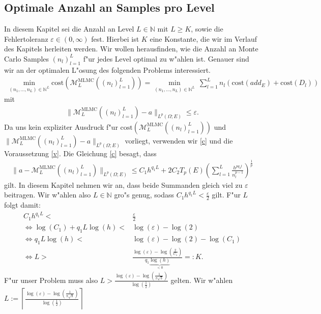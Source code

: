 \subsection{Optimale Anzahl an Samples pro Level}
In diesem Kapitel sei die Anzahl an Level $L\in\mathbb{N}$ mit $L\geq K$, sowie die Fehlertoleranz $\varepsilon\in (0,\infty)$ fest. Hierbei ist $K$ eine Konstante, die wir im Verlauf des Kapitels herleiten werden. Wir wollen herausfinden, wie die Anzahl an Monte Carlo Samples $(n_l)_{l=1}^L$ f"ur jedes Level optimal zu w"ahlen ist. Genauer sind wir an der optimalen L"osung des folgenden Problems interessiert.
\begin{align*}
\min_{(n_1,...,n_L) \in\mathbb{N}^L}\text{cost}\left(\mathcal{M}_L^{\text{MLMC}} ((n_l)_{l=1}^L)\right)=\min_{(n_1,...,n_L) \in\mathbb{N}^L} \ \sum_{l=1}^Ln_l(\text{cost}(add_E)+\text{cost}(D_l))
\end{align*}
mit
\begin{align*}
\|\mathcal{M}_L^{\text{MLMC}} ((n_l)_{l=1}^L)-a\|_{L^p(\Omega;E)}\leq \varepsilon.
\end{align*}
Da uns kein expliziter Ausdruck f"ur $\text{cost}\left(\mathcal{M}_L^{\text{MLMC}} ((n_l)_{l=1}^L)\right)$ und\\ $\|\mathcal{M}_L^{\text{MLMC}} ((n_l)_{l=1}^L)-a\|_{L^p(\Omega;E)}$ vorliegt, verwenden  wir \eqref{c} und die Voraussetzung \ref{v}.
Die Gleichung \eqref{c} besagt, dass
\begin{align*}
\|a-\mathcal{M}_L^{\text{MLMC}}((n_l)_{l=1}^L)\|_{L^p(\Omega;E)}\leq C_1 h^{q_1L}+2C_2 T_p(E)\left(\sum_{l=1}^L \frac{h^{p q_2 l}}{n_l^{p-1}}\right)^{\frac{1}{p}}
\end{align*} gilt.
In diesem Kapitel nehmen wir an, dass beide Summanden gleich viel zu $\varepsilon$ beitragen.
Wir w"ahlen also $L\in\mathbb{N}$ gro"s genug, sodass $C_1h^{q_1L}<\frac{\varepsilon}{2}$ gilt. F"ur $L$ folgt damit:
\begin{align}
C_1h^{q_1L}<&\frac{\varepsilon}{2} \nonumber \\ \nonumber
\Leftrightarrow \log(C_1)+q_1L\log(h)<&\log(\varepsilon)-\log(2)\\
\Leftrightarrow q_1L\log(h)<&\log(\varepsilon)-\log(2)-\log(C_1)\nonumber\\
\Leftrightarrow L>&\frac{\log(\varepsilon)-\log(\frac{2}{C_1})}{q_1\underbrace{\log(h)}_{<0}}=:K. \label{L1}
\end{align}
F"ur unser Problem muss also $L>\frac{\log(\varepsilon)-\log(\frac{1}{\pi\sqrt{3}})}{\log(\frac{1}{2})}$ gelten.
Wir w"ahlen  $L:=\left\lceil \frac{\log(\varepsilon)-\log(\frac{1}{\pi\sqrt{3}})}{\log(\frac{1}{2})} \right\rceil$
